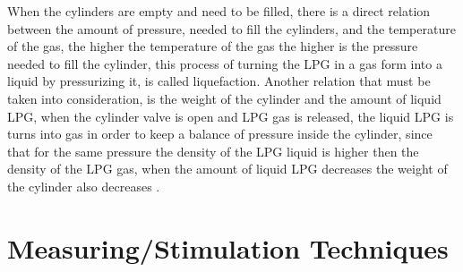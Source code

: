 When the cylinders are empty and need to be filled, there is a direct relation between the amount of pressure, needed to fill the cylinders, and the temperature of the gas, the higher the temperature of the gas the higher is the pressure needed to fill the cylinder, this process of turning the LPG in a gas form into a liquid by pressurizing it, is called liquefaction. Another relation that must be taken into consideration, is the weight of the cylinder and the amount of liquid LPG, when the cylinder valve is open and LPG gas is released, the liquid LPG is turns into gas in order to keep a balance of pressure inside the cylinder, since that for the same pressure the density of the LPG liquid is higher then the density of the LPG gas, when the amount of liquid LPG decreases the weight of the cylinder also decreases \cite{WhatAreProperties} \cite{PropaneDensitySpecific}.


\section{Measuring/Stimulation Techniques}
